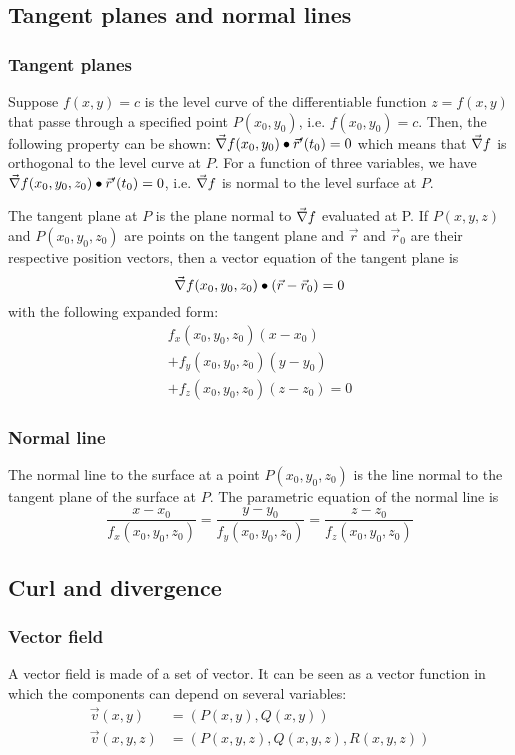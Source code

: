 \documentclass[10pt, twocolumn]{article}
\theoremstyle{remark}
\begin{document}
\subsection{Tangent planes and normal lines}
\subsubsection*{Tangent planes}
Suppose \(f(x, y) = c\) is the level curve of the differentiable function \(z = f(x, y)\) that passe through a specified point \(P(x_0 , y_0 )\), i.e. \(f(x_0 , y_0 ) = c\).
Then, the following property can be shown: \(\vec{\nabla}f(x_0 , y_0 ) \bullet \vec{r}'(t_0 ) = 0\) which means that \(\vec{\nabla}f\) is orthogonal to the level curve at \(P\).
For a function of three variables, we have \(\vec{\nabla}f(x_0 , y_0 , z_0 ) \bullet \vec{r}'(t_0 ) = 0\), i.e. \(\vec{\nabla}f\) is normal to the level surface at \(P\).

The tangent plane at \(P\) is the plane normal to \(\vec{\nabla}f\) evaluated at P.
If \(P(x, y, z)\) and \(P(x_0 , y_0 , z_0 )\) are points on the tangent plane and \(\vec{r}\) and \(\vec{r}_0 \) are their respective position vectors, then a vector equation of the tangent plane is
\[
  \vec{\nabla}f(x_0 , y_0 , z_0 ) \bullet (\vec{r} - \vec{r}_0 ) = 0
\]
with the following expanded form:
\begin{multline*}
  f_x (x_0 , y_0 , z_0 )(x - x_0 ) \\ + f_y (x_0 , y_0 , z_0 )(y - y_0 ) \\ +  f_z (x_0 , y_0 , z_0 )(z - z_0 ) = 0
\end{multline*}

\subsubsection*{Normal line}
The normal line to the surface at a point \(P(x_0 , y_0 , z_0 )\) is the line normal to the tangent plane of the surface at \(P\).
The parametric equation of the normal line is
\[
  \frac{x - x_0 }{f_x (x_0 , y_0 , z_0 )} = \frac{y - y_0 }{f_y (x_0 , y_0 , z_0 )} = \frac{z - z_0 }{f_z (x_0 , y_0 , z_0 )}
\]

\subsection{Curl and divergence}
\subsubsection*{Vector field}
A vector field is made of a set of vector.
It can be seen as a vector function in which the components can depend on several variables:
\begin{align*}
  \vec{v}(x, y)    & = \left( P(x, y), Q(x, y) \right)                   \\
  \vec{v}(x, y, z) & = \left( P(x, y, z), Q(x, y, z), R(x, y, z) \right)
\end{align*}
\end{document}
